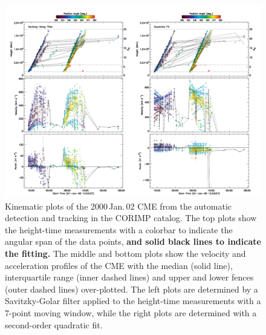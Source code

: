 \documentclass[referee,a4paper,12pt,traditabstract]{swsc}
\begin{document}
\begin{linenumbers}
\begin{figure}[t]
\centerline{\includegraphics[width=\linewidth]{images/20000102_corimp_kins.pdf}}
\caption{Kinematic plots of the 2000\,Jan.\,02 CME from the automatic detection and tracking in the CORIMP catalog. The top plots show the height-time measurements with a colorbar to indicate the angular span of the data points, {\bf and solid black lines to indicate the fitting.} The middle and bottom plots show the velocity and acceleration profiles of the CME with the median (solid line), interquartile range (inner dashed lines) and upper and lower fences (outer dashed lines) over-plotted. The left plots are determined by a Savitzky-Golar filter applied to the height-time measurements with a 7-point moving window, while the right plots are determined with a second-order quadratic fit.}
\label{20000102_corimp_kins}
\end{figure}


\end{linenumbers}
\end{document}
